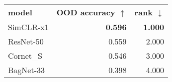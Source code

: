 \begin{tabular}{lrr}
\toprule
    model & OOD accuracy $\uparrow$ & rank $\downarrow$ \\
\midrule
SimCLR-x1 &          \textbf{0.596} &    \textbf{1.000} \\
ResNet-50 &                   0.559 &             2.000 \\
Cornet\_S &                   0.546 &             3.000 \\
BagNet-33 &                   0.398 &             4.000 \\
\bottomrule
\end{tabular}

